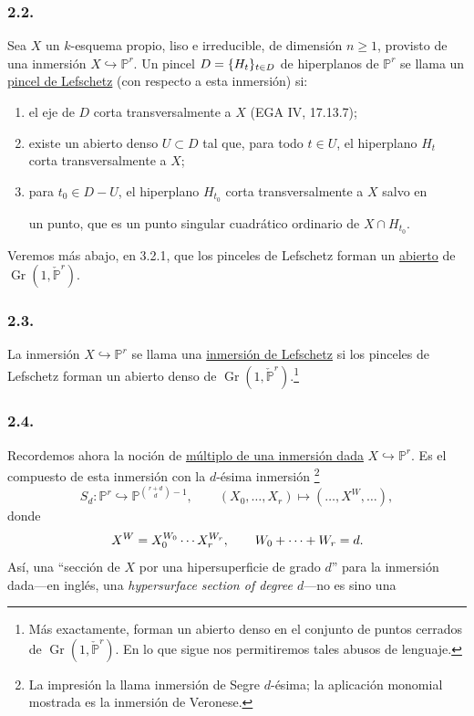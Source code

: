 \subsubsection*{2.2.}
Sea $X$ un $k$-esquema propio, liso e irreducible, de dimensión
$n\geq1$, provisto de una inmersión
$X\hookrightarrow\mathbb P^r$. Un pincel
$D=\{H_t\}_{t\in\sisi{\mathbb P}{D}}$ de hiperplanos de
$\mathbb P^r$ se llama un \underline{pincel de Lefschetz} (con
respecto a esta inmersión) si:
\begin{enumerate}
\item[(a)] el eje de $D$ corta transversalmente a $X$
(EGA IV, 17.13.7);
\item[(b)] existe un abierto denso $U\subset D$ tal que, para todo
$t\in U$, el hiperplano $H_t$ corta transversalmente a $X$;
\item[(c)] para $t_0\in D-U$, el hiperplano $H_{t_0}$ corta
transversalmente a $X$ salvo en

\pageoriginale

un punto, que es un punto singular cuadrático ordinario de
$X\cap H_{t_0}$.
\end{enumerate}
Veremos más abajo, en 3.2.1, que los pinceles de Lefschetz forman un
\underline{abierto} de
$\operatorname{Gr}(1,\check{\mathbb P}^{r})$.

\subsubsection*{2.3.}
La inmersión $X\hookrightarrow\mathbb P^r$ se llama una
\underline{inmersión de Lefschetz} si los pinceles de Lefschetz
forman un abierto denso de
$\operatorname{Gr}(1,\check{\mathbb P}^{r})$.\footnote{Más
exactamente, forman un abierto denso en el conjunto de puntos cerrados
de $\operatorname{Gr}(1,\check{\mathbb P}^{r})$. En lo que sigue nos
permitiremos tales abusos de lenguaje.}

\subsubsection*{2.4.}
Recordemos ahora la noción de \underline{múltiplo de una inmersión
dada} $X\hookrightarrow\mathbb P^r$. Es el compuesto de esta inmersión
con la $d$-ésima inmersión
\footnote{La impresión la llama inmersión
de Segre $d$-ésima; la aplicación monomial mostrada es la inmersión de
Veronese.}
\[
S_d:\mathbb P^r\hookrightarrow
\mathbb P^{\binom{r+d}{d}-1},
\qquad
(X_0,\ldots,X_r)\longmapsto(\ldots,X^W,\ldots),
\]
donde
\[
X^W=X_0^{W_0}\cdots X_r^{\sisi{W_0}{W_r}},
\qquad W_0+\cdots+W_r=d.
\]
Así, una ``sección de $X$ por una hipersuperficie de grado $d$'' para
la inmersión dada---en inglés, una \emph{hypersurface section of
degree $d$}---no es sino una

